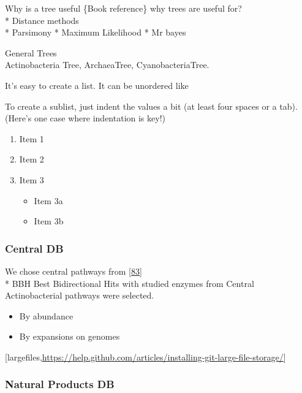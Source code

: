 \documentclass[12pt,twoside]{reedthesis}
\providecommand{\tightlist}{%
  \setlength{\itemsep}{0pt}\setlength{\parskip}{0pt}}
\begin{document}
  Why is a tree useful \{Book reference\} why trees are useful for?\\
  * Distance methods\\
  * Parsimony * Maximum Likelihood * Mr bayes
  
  General Trees\\
  Actinobacteria Tree, ArchaeaTree, CyanobacteriaTree.
  
  It's easy to create a list. It can be unordered like
  
  To create a sublist, just indent the values a bit (at least four spaces
  or a tab). (Here's one case where indentation is key!)
  
  \begin{enumerate}
  \def\labelenumi{\arabic{enumi}.}
  \tightlist
  \item
    Item 1
  \item
    Item 2
  \item
    Item 3
  
    \begin{itemize}
    \tightlist
    \item
      Item 3a
    \item
      Item 3b
    \end{itemize}
  \end{enumerate}
  
  \subsubsection{Central DB}\label{central-db}
  
  We chose central pathways from
  {[}\protect\hyperlink{ref-barona-gomezux5fwhatux5f2012}{83}{]}\\
  * BBH Best Bidirectional Hits with studied enzymes from Central
  Actinobacterial pathways were selected.
  
  \begin{itemize}
  \item
    By abundance
  \item
    By expansions on genomes
  \end{itemize}
  
  {[}largefiles,\url{https://help.github.com/articles/installing-git-large-file-storage/}{]}
  
  \subsubsection{Natural Products DB}\label{natural-products-db}
  
\end{document}
